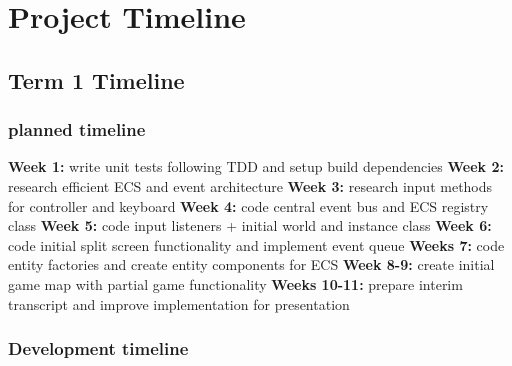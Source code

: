 \documentclass[]{final_report}
\begin{document}
\chapter{Project Timeline}
\section{Term 1 Timeline}
\subsection{planned timeline}
\textbf{ Week 1:} write unit tests following TDD and setup build dependencies \newline
\textbf{Week 2:} research efficient ECS and event architecture \newline
\textbf{Week 3:} research input methods for controller and keyboard \newline
\textbf{Week 4:} code central event bus and ECS registry class \newline
\textbf{Week 5:} code input listeners + initial world and instance class \newline
\textbf{Week 6:} code initial split screen functionality and implement event queue \newline
\textbf{Weeks 7:} code entity factories and create entity components for ECS \newline
\textbf{Week 8-9:} create initial game map with partial game functionality \newline
\textbf{Weeks 10-11:} prepare interim transcript and improve implementation for presentation \newline
\subsection{Development timeline}
\end{document}
